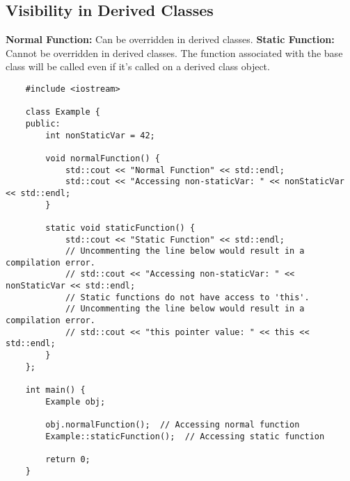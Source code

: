 \documentclass{article}
\begin{document}
\subsection*{Visibility in Derived Classes}
\textbf{Normal Function:} Can be overridden in derived classes.
\textbf{Static Function:} Cannot be overridden in derived classes. The function associated with the base class will be called even if it's called on a derived class object.
\newpage
\begin{verbatim}
    #include <iostream>
    
    class Example {
    public:
        int nonStaticVar = 42;
    
        void normalFunction() {
            std::cout << "Normal Function" << std::endl;
            std::cout << "Accessing non-staticVar: " << nonStaticVar << std::endl;
        }
    
        static void staticFunction() {
            std::cout << "Static Function" << std::endl;
            // Uncommenting the line below would result in a compilation error.
            // std::cout << "Accessing non-staticVar: " << nonStaticVar << std::endl;
            // Static functions do not have access to 'this'.
            // Uncommenting the line below would result in a compilation error.
            // std::cout << "this pointer value: " << this << std::endl;
        }
    };
    
    int main() {
        Example obj;
        
        obj.normalFunction();  // Accessing normal function
        Example::staticFunction();  // Accessing static function
    
        return 0;
    }
    \end{verbatim}
\end{document}
